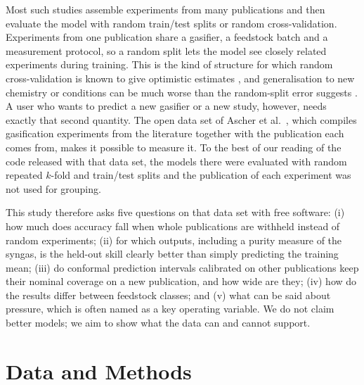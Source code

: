 \documentclass[11pt,a4paper]{article}
\begin{document}
Most such studies assemble experiments from many publications and then evaluate the model with random train/test splits or random cross-validation. Experiments from one publication share a gasifier, a feedstock batch and a measurement protocol, so a random split lets the model see closely related experiments during training. This is the kind of structure for which random cross-validation is known to give optimistic estimates \cite{Roberts2017}, and generalisation to new chemistry or conditions can be much worse than the random-split error suggests \cite{Meredig2018}. A user who wants to predict a new gasifier or a new study, however, needs exactly that second quantity.
The open data set of Ascher et al.\ \cite{Ascher2022}, which compiles gasification experiments from the literature together with the publication each comes from, makes it possible to measure it. To the best of our reading of the code released with that data set, the models there were evaluated with random repeated $k$-fold and train/test splits and the publication of each experiment was not used for grouping.

This study therefore asks five questions on that data set with free software: (i) how much does accuracy fall when whole publications are withheld instead of random experiments; (ii) for which outputs, including a purity measure of the syngas, is the held-out skill clearly better than simply predicting the training mean; (iii) do conformal prediction intervals calibrated on other publications keep their nominal coverage on a new publication, and how wide are they; (iv) how do the results differ between feedstock classes; and (v) what can be said about pressure, which is often named as a key operating variable. We do not claim better models; we aim to show what the data can and cannot support.

\section{Data and Methods}
\end{document}
